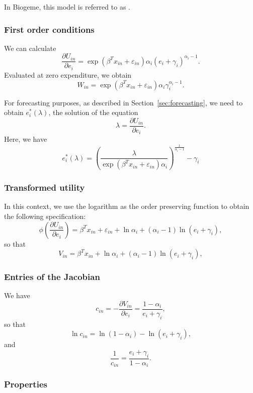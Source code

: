 \documentclass[12pt,a4paper]{article}
\begin{document}
In Biogeme, this model is referred to as
\lstinline@translated@.
\subsubsection*{First order conditions}

We can calculate
\begin{equation}
\frac{\partial U_{in}}{\partial e_i} = \exp(\beta^T x_{in} + \varepsilon_{in})\alpha_i(e_i + \gamma_i)^{\alpha_i-1}.
\end{equation}
Evaluated at zero expenditure, we obtain
\begin{equation}
W_{in} = \exp(\beta^T x_{in} + \varepsilon_{in})\alpha_i \gamma_i^{\alpha_i-1}.
\end{equation}

For forecasting purposes, as described in Section~\ref{sec:forecasting}, we need to obtain $e_i^*(\lambda)$, the solution of the equation
\[\lambda = \frac{\partial U_{in}}{\partial e_i}. \]
Here, we have
\begin{equation}
    \label{eq:translated_optimal}
 e_i^*(\lambda) = \left(\frac{\lambda}{\exp(\beta^T x_{in} + \varepsilon_{in})\alpha_i}\right)^{\frac{1}{\alpha_i-1}} - \gamma_i
\end{equation}

\subsubsection*{Transformed utility}
In this context, we use the logarithm as the order preserving function to obtain the following specification:
\[
\phi\left(\frac{\partial U_{in}}{\partial e_i}\right) =\beta^T x_{in} + \varepsilon_{in} + \ln \alpha_i + (\alpha_i-1) \ln (e_i + \gamma_i),
\]
so that
\[
V_{in} = \beta^T x_{in} + \ln \alpha_i + (\alpha_i-1) \ln (e_i + \gamma_i),
\]

\subsubsection*{Entries of the Jacobian}

We have
\[
c_{in} = -\frac{\partial V_{in}}{\partial e_i} = \frac{1-\alpha_i}{e_i + \gamma_i},
\]
so that
\[
\ln c_{in}  = \ln(1-\alpha_i) - \ln(e_i + \gamma_i),
\]
and
\[
    \frac{1}{c_{in}} = \frac{e_i + \gamma_i}{1-\alpha_i}.
\]

\subsubsection*{Properties}
\end{document}
